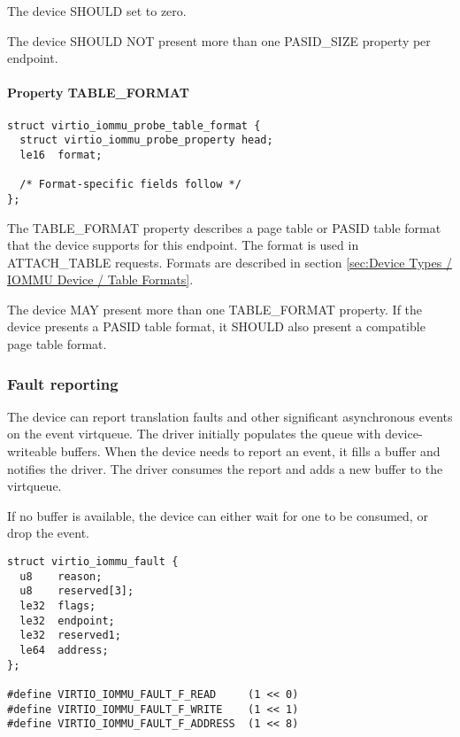 The device SHOULD set  to zero.

The device SHOULD NOT present more than one PASID_SIZE property
per endpoint.


\paragraph{Property TABLE_FORMAT}\label{sec:Device Types / IOMMU Device / Device operations / PROBE properties / TABLE_FORMAT}

\begin{lstlisting}
struct virtio_iommu_probe_table_format {
  struct virtio_iommu_probe_property head;
  le16  format;

  /* Format-specific fields follow */
};
\end{lstlisting}

The TABLE_FORMAT property describes a page table or PASID table
format that the device supports for this endpoint. The format is
used in ATTACH_TABLE requests. Formats are described in section
\ref{sec:Device Types / IOMMU Device / Table Formats}.


The device MAY present more than one TABLE_FORMAT property. If
the device presents a PASID table format, it SHOULD also present
a compatible page table format.


\subsubsection{Fault reporting}\label{sev:Device Types / IOMMU Device / Device operations / Fault reporting}

The device can report translation faults and other significant
asynchronous events on the event virtqueue. The driver initially populates
the queue with device-writeable buffers. When the device needs to report
an event, it fills a buffer and notifies the driver. The driver consumes
the report and adds a new buffer to the virtqueue.

If no buffer is available, the device can either wait for one to be
consumed, or drop the event.

\begin{lstlisting}
struct virtio_iommu_fault {
  u8    reason;
  u8    reserved[3];
  le32  flags;
  le32  endpoint;
  le32  reserved1;
  le64  address;
};

#define VIRTIO_IOMMU_FAULT_F_READ     (1 << 0)
#define VIRTIO_IOMMU_FAULT_F_WRITE    (1 << 1)
#define VIRTIO_IOMMU_FAULT_F_ADDRESS  (1 << 8)
\end{lstlisting}


